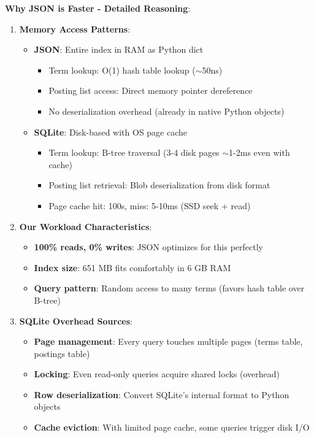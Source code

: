 \documentclass[12pt,a4paper]{article}
\begin{document}
\textbf{Why JSON is Faster - Detailed Reasoning}:

\begin{enumerate}
    \item \textbf{Memory Access Patterns}:
    \begin{itemize}
        \item \textbf{JSON}: Entire index in RAM as Python dict
        \begin{itemize}
            \item Term lookup: O(1) hash table lookup ($\sim$50ns)
            \item Posting list access: Direct memory pointer dereference
            \item No deserialization overhead (already in native Python objects)
        \end{itemize}
        \item \textbf{SQLite}: Disk-based with OS page cache
        \begin{itemize}
            \item Term lookup: B-tree traversal (3-4 disk pages $\sim$1-2ms even with cache)
            \item Posting list retrieval: Blob deserialization from disk format
            \item Page cache hit: 100\textmu s, miss: 5-10ms (SSD seek + read)
        \end{itemize}
    \end{itemize}
    
    \item \textbf{Our Workload Characteristics}:
    \begin{itemize}
        \item \textbf{100\% reads, 0\% writes}: JSON optimizes for this perfectly
        \item \textbf{Index size}: 651 MB fits comfortably in 6 GB RAM
        \item \textbf{Query pattern}: Random access to many terms (favors hash table over B-tree)
    \end{itemize}
    
    \item \textbf{SQLite Overhead Sources}:
    \begin{itemize}
        \item \textbf{Page management}: Every query touches multiple pages (terms table, postings table)
        \item \textbf{Locking}: Even read-only queries acquire shared locks (overhead)
        \item \textbf{Row deserialization}: Convert SQLite's internal format to Python objects
        \item \textbf{Cache eviction}: With limited page cache, some queries trigger disk I/O
    \end{itemize}
\end{enumerate}
\end{document}
